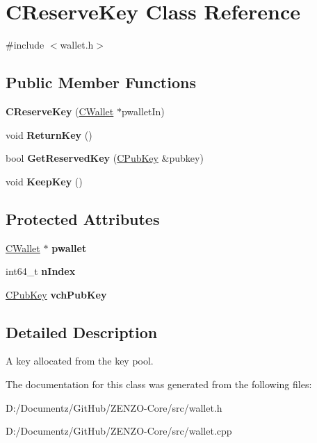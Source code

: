 \hypertarget{class_c_reserve_key}{}\section{C\+Reserve\+Key Class Reference}
\label{class_c_reserve_key}


{\ttfamily \#include $<$wallet.\+h$>$}

\subsection*{Public Member Functions}
\begin{DoxyCompactItemize}
\item 
\mbox{\label{class_c_reserve_key_ab5c15654a1e28bf5f2852512381d07c4}} 
{\bfseries C\+Reserve\+Key} (\mbox{\hyperlink{class_c_wallet}{C\+Wallet}} $\ast$pwallet\+In)
\item 
void {\bfseries Return\+Key} ()
\item 
bool {\bfseries Get\+Reserved\+Key} (\mbox{\hyperlink{class_c_pub_key}{C\+Pub\+Key}} \&pubkey)
\item 
void {\bfseries Keep\+Key} ()
\end{DoxyCompactItemize}
\subsection*{Protected Attributes}
\begin{DoxyCompactItemize}
\item 
\mbox{\label{class_c_reserve_key_aab8a4052c0b9a4337248ae53e77c6115}} 
\mbox{\hyperlink{class_c_wallet}{C\+Wallet}} $\ast$ {\bfseries pwallet}
\item 
\mbox{\label{class_c_reserve_key_a16d05c9be039eb772f2daf412cca1991}} 
int64\+\_\+t {\bfseries n\+Index}
\item 
\mbox{\label{class_c_reserve_key_a2b252444577b6aca8b497c2207ff17a4}} 
\mbox{\hyperlink{class_c_pub_key}{C\+Pub\+Key}} {\bfseries vch\+Pub\+Key}
\end{DoxyCompactItemize}


\subsection{Detailed Description}
A key allocated from the key pool. 

The documentation for this class was generated from the following files\+:\begin{DoxyCompactItemize}
\item 
D\+:/\+Documentz/\+Git\+Hub/\+Z\+E\+N\+Z\+O-\/\+Core/src/wallet.\+h\item 
D\+:/\+Documentz/\+Git\+Hub/\+Z\+E\+N\+Z\+O-\/\+Core/src/wallet.\+cpp\end{DoxyCompactItemize}
